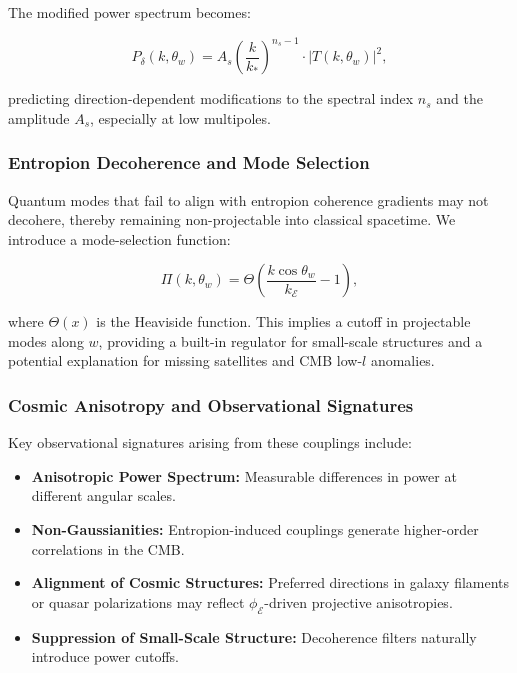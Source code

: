 \documentclass[12pt]{article}
\begin{document}
The modified power spectrum becomes:

\begin{equation}
\label{eq:power_spectrum}
P_\delta(k, \theta_w) = A_s \left( \frac{k}{k_*} \right)^{n_s - 1} \cdot \left| T(k, \theta_w) \right|^2,
\end{equation}

predicting direction-dependent modifications to the spectral index \(n_s\) and the amplitude \(A_s\), especially at low multipoles.

\subsubsection*{Entropion Decoherence and Mode Selection}

Quantum modes that fail to align with entropion coherence gradients may not decohere, thereby remaining non-projectable into classical spacetime. We introduce a mode-selection function:

\begin{equation}
\label{eq:mode_selection}
\Pi(k, \theta_w) = \Theta \left( \frac{k \cos \theta_w}{k_{\mathcal{E}}} - 1 \right),
\end{equation}

where \(\Theta(x)\) is the Heaviside function. This implies a cutoff in projectable modes along \(w\), providing a built-in regulator for small-scale structures and a potential explanation for missing satellites and CMB low-\(l\) anomalies.

\subsubsection*{Cosmic Anisotropy and Observational Signatures}

Key observational signatures arising from these couplings include:
\begin{itemize}
  \item \textbf{Anisotropic Power Spectrum:} Measurable differences in power at different angular scales.
  \item \textbf{Non-Gaussianities:} Entropion-induced couplings generate higher-order correlations in the CMB.
  \item \textbf{Alignment of Cosmic Structures:} Preferred directions in galaxy filaments or quasar polarizations may reflect \(\phi_{\mathcal{E}}\)-driven projective anisotropies.
  \item \textbf{Suppression of Small-Scale Structure:} Decoherence filters naturally introduce power cutoffs.
\end{itemize}
\end{document}
